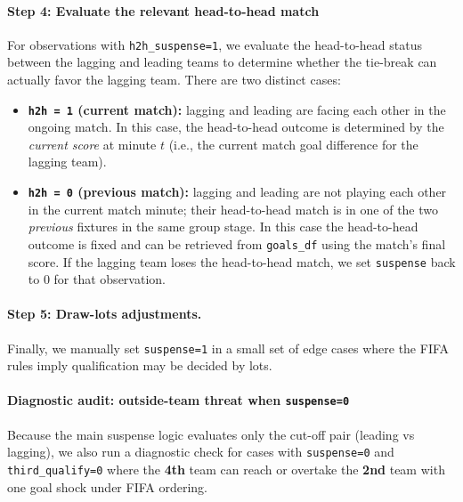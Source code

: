 \documentclass[11pt]{article}
\begin{document}
\paragraph{Step 4: Evaluate the relevant head-to-head match}


For observations with \texttt{h2h\_suspense=1}, we evaluate the head-to-head status between the lagging and leading teams to determine whether the tie-break can actually favor the lagging team.
There are two distinct cases:
\begin{itemize}
    \item \textbf{\texttt{h2h = 1} (current match):} lagging and leading are facing each other in the ongoing match. In this case, the head-to-head outcome is determined by the \emph{current score} at minute $t$ (i.e., the current match goal difference for the lagging team).
    \item \textbf{\texttt{h2h = 0} (previous match):} lagging and leading are not playing each other in the current match minute; their head-to-head match is in one of the two \emph{previous} fixtures in the same group stage. In this case the head-to-head outcome is fixed and can be retrieved from \texttt{goals\_df} using the match's final score. If the lagging team loses the head-to-head match, we set \texttt{suspense} back to 0 for that observation.
\end{itemize}

\paragraph{Step 5: Draw-lots adjustments.}

Finally, we manually set \texttt{suspense=1} in a small set of edge cases where the FIFA rules imply qualification may be decided by lots.

\paragraph{Diagnostic audit: outside-team threat when \texttt{suspense=0}}
Because the main suspense logic evaluates only the cut-off pair (leading vs lagging), we also run a diagnostic check for cases with \texttt{suspense=0} and \texttt{third\_qualify=0} where the \textbf{4th} team can reach or overtake the \textbf{2nd} team with one goal shock under FIFA ordering.
\end{document}

